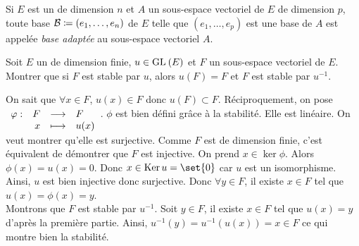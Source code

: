 \documentclass{magnolia}
\begin{document}
\begin{remarqueUnique}
\remarque Si $E$ est un \Kev de dimension $n$ et $A$ un sous-espace vectoriel de $E$
  de dimension $p$, toute base $\mathcal{B}\coloneqq(e_1,\ldots,e_n)$ de $E$
  telle que $(e_1,\ldots,e_p)$ est une base de $A$ est appelée \emph{base adaptée}
  au sous-espace vectoriel $A$.
\end{remarqueUnique}

\begin{exoUnique}
\exo Soit $E$ un \Kev de dimension finie, $u\in{\rm GL}_{}\left(E\right)$ et $F$ un
  sous-espace vectoriel de $E$. Montrer que si $F$ est stable par $u$,
  alors $u(F)=F$ et $F$ est stable par $u^{-1}$.

\end{exoUnique}

  \begin{sol}
  On sait que $\forall x \in F$, $u(x)\in F$ donc $u(F)\subset F$. Réciproquement, on pose $\begin{array}[t]{lrcl} \displaystyle{\varphi} : & \displaystyle{F} & \longrightarrow & \displaystyle{F} \\ & \displaystyle{x} & \longmapsto & \displaystyle{u(x)} \end{array}$. $\phi$ est bien défini grâce à la stabilité. Elle est linéaire. On veut montrer qu'elle est surjective. Comme $F$ est de dimension finie, c'est équivalent de démontrer que $F$ est injective. On prend $x\in \ker\phi$. Alors $\phi(x)=u(x)=0$. Donc $x\in \ker u=\set{0}$ car $u$ est un isomorphisme. Ainsi, $u$ est bien injective donc surjective. Donc $\forall y \in F$, il existe $x\in F$ tel que $u(x)=\phi(x)=y$.\\
  Montrons que $F$ est stable par $u^{-1}$. Soit $y\in F$, il existe $x\in F$ tel que $u(x)=y$ d'après la première partie. Ainsi, $u^{-1}(y)=u^{-1}(u(x))=x \in F$ ce qui montre bien la stabilité.
  \end{sol}
\end{document}
